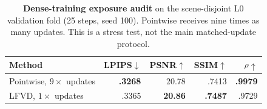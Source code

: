 \begin{table}[t]
\centering
\caption{\textbf{Dense-training exposure audit} on the scene-disjoint L0
validation fold (25 steps, seed 100). Pointwise receives nine times as many
updates. This is a stress test, not the main matched-update protocol.}
\label{tab:exposure_audit}
\scriptsize
\setlength{\tabcolsep}{3.0pt}
\begin{tabular*}{\linewidth}{@{\extracolsep{\fill}}lrrrr@{}}
\toprule
Method & LPIPS$\downarrow$ & PSNR$\uparrow$ & SSIM$\uparrow$ & $\rho\uparrow$ \\
\midrule
Pointwise, $9\times$ updates & \textbf{.3268} & 20.78 & .7413 & \textbf{.9979} \\
LFVD, $1\times$ updates & .3365 & \textbf{20.86} & \textbf{.7487} & .9729 \\
\bottomrule
\end{tabular*}
\end{table}
